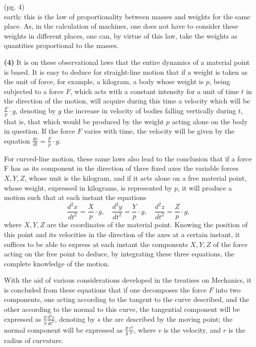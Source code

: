 \documentclass{book}
\begin{document}
\newpage
(pg. 4) \\

earth: this is the law of proportionality between masses and weights for the same place. As, in the calculation of machines, one does not have to consider these weights in different places, one can, by virtue of this law, take the weights as quantities proportional to the masses.

 \textbf{(4)} It is on these observational laws that the entire dynamics of a material point is based. It is easy to deduce for straight-line motion that if a weight is taken as the unit of force, for example, a kilogram, a body whose weight is \(p\), being subjected to a force \(F\), which acts with a constant intensity for a unit of time 
\(t\) in the direction of the motion, will acquire during this time a velocity which will be \(\frac{F}{p} \cdot g\), denoting by \(g\) the increase in velocity of bodies falling vertically during \(t\),
that is, that which would be produced by the weight \(p\) acting alone on the body in question. If the force \(F\) varies with time, the velocity will be given by the equation \(\frac{dv}{dt} = \frac{F}{p} \cdot g\).

For curved-line motion, these same laws also lead to the conclusion that if a force F has as its component in the direction of three fixed axes the variable forces \(X, Y, Z\), whose unit is the kilogram, and if it acts alone on a free material point, whose weight, expressed in kilograms, is represented by \(p\), it will produce a motion such that at each instant the equations
\[
\frac{d^2x}{dt^2} = \frac{X}{p} \cdot g, \quad \frac{d^2y}{dt^2} = \frac{Y}{p} \cdot g, \quad \frac{d^2z}{dt^2} = \frac{Z}{p} \cdot g,
\]
where \(X,Y,Z \) are the coordinates of the material point. Knowing the position of this point and its velocities in the direction of the axes at a certain instant, it suffices to be able to express at each instant the components \( X, Y, Z \) of the force acting on the free point to deduce, by integrating these three equations, the complete knowledge of the motion.

With the aid of various considerations developed in the treatises on Mechanics, it is concluded from these equations that if one decomposes the force \( F \) into two components, one acting according to the tangent to the curve described, and the other according to the normal to this curve, the tangential component will be expressed as \( \frac{p}{g} \frac{d^2s}{dt^2} \), denoting by \( s \) the arc described by the moving point; the normal component will be expressed as \( \frac{p}{g} \frac{v^2}{r} \), where \( v \) is the velocity, and \( r \) is the radius of curvature.
\end{document}
